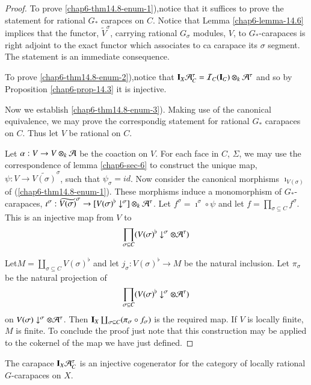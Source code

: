 \begin{proof}
To prove \ref{chap6-thm14.8-enum-1}),notice that it suffices to prove the statement for rational $G_{*}$ carapces on $C$. Notice that Lemma \ref{chap6-lemma-14.6} implices that the functor, $\widetilde{V}^{\sigma}$, carrying rational $G_{\sigma}$ modules, $V$, to $G_{*}$-carapaces is right adjoint to the exact functor which associates to ca carapace its $\sigma$ segment. The statement is an immediate consequence.

To prove \ref{chap6-thm14.8-enum-2}),notice that $\mathbf{I}_{X}\mathcal{A}_{C}^{\tau} = \mathcal{I}_{C}(\mathbf{I}_{C}) \otimes_{k} \mathcal{A}^{\tau}$ and so by Proposition \ref{chap6-prop-14.3} it is injective.

Now we establish \ref{chap6-thm14.8-enum-3}). Making use of the canonical equivalence, we may prove the correspondig statement for rational $G_{*}$ carapaces on $C$. Thus let $V$ be rational on $C$.

Let $\alpha : V \rightarrow V \otimes_{k} \mathcal{A}$ be the coaction on $V$. For each face in $C$, $\Sigma$, we may use the correspondence of lemma \ref{chap6-sec-6} to construct the unique map, $\psi: V \rightarrow \widetilde{V(\sigma)}^{\sigma}$, such that $\psi_{\sigma} = id$. Now consider the canonical morphisms $\imath_{V(\sigma)}$ of (\ref{chap6-thm14.8-enum-1}). These morphisms induce a monomorphism of $G_{*}$-carapaces, $\imath^{\sigma} : \widetilde{V(\sigma)}^{\sigma} \rightarrow [V(\sigma)^{\flat}\downarrow^{\sigma}]\otimes_{k}\mathcal{A}^{\tau}$. Let $f^{\sigma} = \imath^{\sigma} \circ \psi$ and let $f = \prod_{\sigma \subseteq C}f^{\sigma}$. This is an injective map from $V$ to
 $$
 \prod_{\sigma \subseteq C}(V(\sigma)^\flat \downarrow^{\sigma} \otimes \mathcal{A}^{\tau})
 $$

 Let\pageoriginale $M= \coprod_{\sigma \subseteq C}V(\sigma)^{\flat}$ and let $j_{\sigma} : V(\sigma)^{\flat} \rightarrow M$ be the natural inclusion. Let $\pi_{\sigma}$ be the natural projection of
 $$
 \prod_{\sigma \subseteq C}(V(\sigma)^{\flat} \downarrow^{\sigma} \otimes \mathcal{A}^{\tau})
 $$
 on $V(\sigma) \downarrow^{\sigma} \otimes \mathcal{A}^{\tau}$. Then $\mathbf{I}_{X}\coprod_{\sigma \subseteq C}(\pi_{\sigma} \circ f_{\sigma})$ is the required map. If $V$ is locally finite, $M$ is finite. To conclude the proof just note that this construction may be applied to the cokernel of the map we have just defined.
\end{proof}

\begin{seccoro}\label{chap6-corollary-14.9}
The carapace $\mathbf{I}_{X}\mathcal{A}_{C}^{\tau}$ is an injective cogenerator for the category of locally rational $G$-carapaces on $X$.
\end{seccoro}


